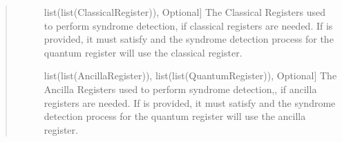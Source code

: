 \documentclass[letterpaper,10pt,english]{sphinxmanual}
\begin{document}
\begin{fulllineitems}
\begin{fulllineitems}
\begin{quote}
\begin{description}
\begin{description}
\item[{}] \leavevmode{[}list(list(ClassicalRegister)), Optional{]}
The Classical Registers used to perform syndrome detection, if classical registers are needed. If  is provided, it must satisfy  and the syndrome detection process for the  quantum register will use the  classical register.

\item[{}] \leavevmode{[}list(list(AncillaRegister)), list(list(QuantumRegister)), Optional{]}
The Ancilla Registers used to perform syndrome detection,, if ancilla registers are needed. If  is provided, it must satisfy  and the syndrome detection process for the  quantum register will use the  ancilla register.

\end{description}

\end{description}\end{quote}

\end{fulllineitems}


\end{fulllineitems}

\end{document}
